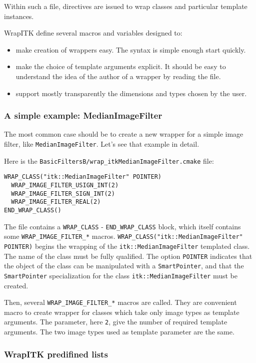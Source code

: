 \documentclass{InsightArticle}
\begin{document}
Within such a file, directives are issued to wrap classes and particular
template instances.

WrapITK define several macros and variables designed to:
\begin{itemize}
  \item make creation of wrappers easy. The syntax is simple enough start quickly.
  \item make the choice of template arguments explicit. It should be easy to understand
the idea of the author of a wrapper by reading the file.
  \item support mostly transparently the dimensions and types chosen by the user.
\end{itemize}

     \subsubsection{A simple example: MedianImageFilter}

The most common case should be to create a new wrapper for a simple image filter, like
\verb$MedianImageFilter$. Let's see that example in detail.

Here is the \verb$BasicFiltersB/wrap_itkMedianImageFilter.cmake$ file:

\small \begin{verbatim}
WRAP_CLASS("itk::MedianImageFilter" POINTER)
  WRAP_IMAGE_FILTER_USIGN_INT(2)
  WRAP_IMAGE_FILTER_SIGN_INT(2)
  WRAP_IMAGE_FILTER_REAL(2)
END_WRAP_CLASS()
\end{verbatim} \normalsize

The file contains a \verb$WRAP_CLASS$ - \verb$END_WRAP_CLASS$ block, which itself contains
some \verb$WRAP_IMAGE_FILTER_*$ macros. \verb$WRAP_CLASS("itk::MedianImageFilter" POINTER)$
begins the wrapping of the \verb$itk::MedianImageFilter$ templated class. The name of the class
must be fully qualified. The option \verb$POINTER$ indicates that the object of the class can be
manipulated with a \verb$SmartPointer$, and that the \verb$SmartPointer$ specialization for
the class \verb$itk::MedianImageFilter$ must be created.

Then, several \verb$WRAP_IMAGE_FILTER_*$ macros are called. They are convenient macro to
create wrapper for classes which take only image types as template arguments. The parameter,
here \verb$2$, give the number of required template arguments. The two image types used as
template parameter are the same.

     \subsubsection{WrapITK predifined lists}
\end{document}
